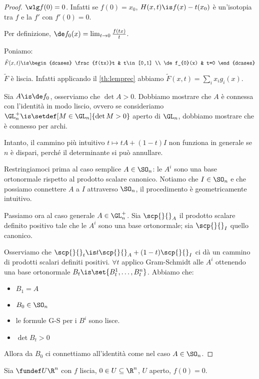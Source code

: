 \begin{proof}
	$\wlg f(0)=0$. Infatti se $f(0)=x_0$, $H(x,t)\is f(x)-t(x_0)$ è un'isotopia tra $f$ e la  $f'$ con $f'(0)=0$.
	
	Per definizione, $\de f_{0}(x)=\lim_{t\to 0}\frac{f(tx)}t$.
	
	Poniamo:
	\[\tilde F(x,t)\is
	\begin{dcases}
		\frac{f(tx)}t & t\in[0,1] \\
		\de f_{0}(x) & t=0
	\end{dcases}\]
	
	\claim $\tilde F$ è liscia. Infatti applicando il \autoref{th:lemprec} abbiamo $\tilde F(x,t)=\sum_ix_ig_i(x)$.
	
	Sia $A\is\de f_{0}$, osserviamo che $\det A>0$.
	Dobbiamo mostrare che $A$ è connessa con l'identità in modo liscio, ovvero se consideriamo $\GL_n^+\is\setdef[M\in\GL_n]{\det M>0}$ aperto di $\GL_n$, dobbiamo mostrare che è connesso per archi.
	
	Intanto, il cammino più intuitivo $t\mapsto tA+(1-t)I$ non funziona in generale se $n$ è dispari, perché il determinante si può annullare.
	
	Restringiamoci prima al caso semplice $A\in\SO_n$: le $A^i$ sono una base ortonormale rispetto al prodotto scalare canonico. Notiamo che $I\in\SO_n$ e che possiamo connettere $A$ a $I$ attraverso $\SO_n$, il procedimento è geometricamente intuitivo.
	
	 Passiamo ora al caso generale $A\in\GL_n^+$. Sia $\scp{}{}_A$ il prodotto scalare definito positivo tale che le $A^i$ sono una base ortonormale; sia $\scp{}{}_I$ quello canonico.
	 
	 Osserviamo che $\scp{}{}_t\is t\scp{}{}_A+(1-t)\scp{}{}_I$ ci dà un cammino di prodotti scalari definiti positivi. $\forall t$ applico Gram-Schmidt alle $A^i$ ottenendo una base ortonormale $B_t\is\set{B_t^1,\dots,B_t^n}$. Abbiamo che:
	 \begin{itemize}
	 	\item $B_1=A$
		\item $B_0\in\SO_n$
		\item le formule G-S per i $B^i$ sono lisce.
		\item $\det B_t>0$
	 \end{itemize} 
	Allora da $B_0$ ci connettiamo all'identità come nel caso $A\in\SO_n$.
\end{proof}

Sia $\fundef U{\R^n}$ con $f$ liscia, $0\in U\subseteq\R^n$, $U$ aperto, $f(0)=0$.

